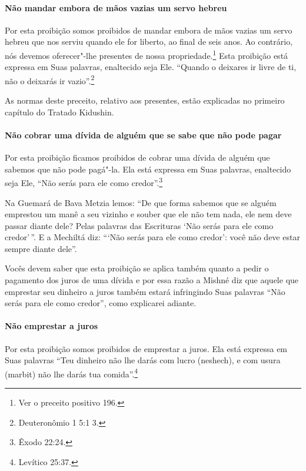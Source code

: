 \begin{multicols}{2}
\paragraph{Não mandar embora de mãos vazias um servo hebreu}

Por esta proibição somos proibidos de mandar embora de mãos vazias um
servo hebreu que nos serviu quando ele for liberto, ao final de seis
anos. Ao contrário, nós devemos oferecer"-lhe presentes de nossa
propriedade.\footnote{Ver o preceito positivo 196.} Esta proibição está expressa em Suas
palavras, enaltecido seja Ele. ``Quando o deixares ir livre de ti, não
o deixarás ir vazio''.\footnote{Deuteronômio 1 5:1 3.}

As normas deste preceito, relativo aos presentes, estão explicadas no
primeiro capítulo do Tratado Kidushin\starr.

\paragraph{Não cobrar uma dívida de alguém que se sabe que não pode pagar}

Por esta proibição ficamos proibidos de cobrar uma dívida de alguém que
sabemos que não pode pagá"-la. Ela está expressa em Suas palavras,
enaltecido seja Ele, ``Não serás para ele como credor''.\footnote{Êxodo 22:24.}

Na Guemará\starr{} de Bava Metzia\starr{} lemos: ``De que forma sabemos que se alguém
emprestou um manê\starr{} a seu vizinho e souber que
ele não tem nada, ele nem deve passar diante dele? Pelas palavras das
Escrituras `Não serás para ele como credor'\,''. E a Mechiltá\starr{} diz: ```Não
serás para ele como credor': você não deve estar sempre diante dele''.

Vocês devem saber que esta proibição se aplica também quanto a pedir o
pagamento dos juros de uma dívida e por essa razão a Mishné diz que
aquele que emprestar seu dinheiro a juros também estará infringindo Suas
palavras ``Não serás para ele como credor'', como explicarei adiante.

\paragraph{Não emprestar a juros}

Por esta proibição somos proibidos de emprestar a juros. Ela está
expressa em Suas palavras ``Teu dinheiro não lhe darás com lucro
(neshech\starr), e com usura (marbit\starr) não lhe darás tua comida''.\footnote{Levítico
25:37.}


\end{multicols}
